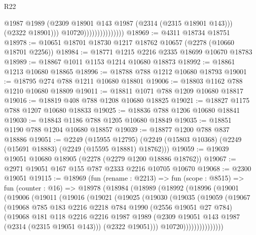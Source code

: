 \begin{lexlean}{R22}
\begin{coremodule}
                                      @1987
                                      @1989
                                      (@2309 @18901 @143 @1987 (@2314 (@2315 @18901 @143)))
                                      (@2322 @18901)))
                                  @10720)))))))))))))))
@18969 := @4311 @18734 @18751
@18978 := @10651 @18701 @18730 @1217 @18762 @10657 (@2278 (@10660 @18701 @2256))
@18984 := @18771 @1215 @2216 @2335 @18699 @10670 @18783
@18989 := @18867 @1011 @1153 @1214 @10680 @18873
@18992 := @18861 @1213 @10680 @18865
@18996 := @18788 @788 @1212 @10680 @18793
@19001 := @18795 @274 @788 @1211 @10680 @18801
@19006 := @18803 @1162 @788 @1210 @10680 @18809
@19011 := @18811 @1071 @788 @1209 @10680 @18817
@19016 := @18819 @408 @788 @1208 @10680 @18825
@19021 := @18827 @1175 @788 @1207 @10680 @18833
@19025 := @18836 @788 @1206 @10680 @18841
@19030 := @18843 @1186 @788 @1205 @10680 @18849
@19035 := @18851 @1190 @788 @1204 @10680 @18857
@19039 := @18877 @1200 @788 @837 @18886
@19051 := @2249
    (@15955 @12795)
    (@2249 (@15803 @10368) (@2249 (@15691 @18883) (@2249 (@15595 @18881) @18762)))
@19059 := @19039 @19051 @10680 @18905 (@2278 (@2279 @1200 @18886 @18762))
@19067 := @2971 @19051 @167 @155 @787 @2333 @2216 @10705 @10670
@19068 := @2300 @19051
@19115 := @18969
    (fun (rename : @2213) =>
    fun (scope : @8515) =>
    fun (counter : @16) =>
    @18978
      (@18984
        (@18989
          (@18992
            (@18996
              (@19001
                (@19006
                  (@19011
                    (@19016
                      (@19021
                        (@19025
                          (@19030
                            (@19035
                              (@19059
                                (@19067
                                  (@19068
                                    @785
                                    @183
                                    @2216
                                    @2218
                                    @784
                                    @1990
                                    (@2556 @19051 @27 @784)
                                    (@19068
                                      @181
                                      @118
                                      @2216
                                      @2216
                                      @1987
                                      @1989
                                      (@2309 @19051 @143 @1987 (@2314 (@2315 @19051 @143)))
                                      (@2322 @19051)))
                                  @10720)))))))))))))))

\end{coremodule}
\end{lexlean}
